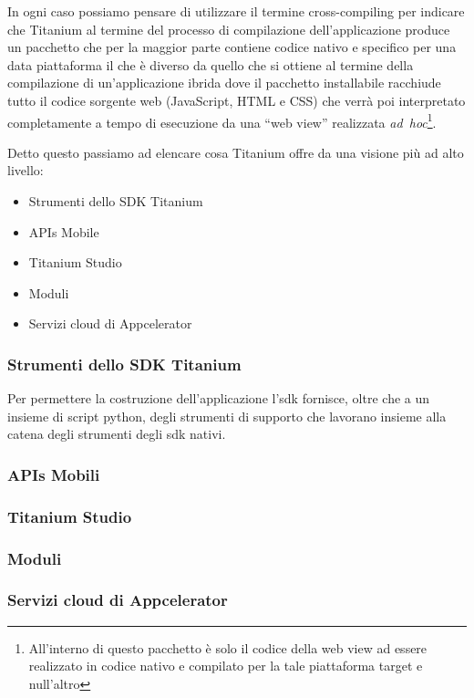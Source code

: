 			In ogni caso possiamo pensare di utilizzare il termine 
			cross-compiling per indicare che Titanium al termine del processo di 
			compilazione dell'applicazione produce un pacchetto che per la 
			maggior parte contiene codice nativo e specifico per una data 
			piattaforma il che è diverso da quello che si ottiene al termine 
			della compilazione di un'applicazione ibrida dove il pacchetto 
			installabile racchiude tutto il codice sorgente web (JavaScript, 
			HTML e CSS) che verrà poi interpretato completamente a tempo di 
			esecuzione da una ``web view'' realizzata 
			\textit{ad~hoc}\footnote{All'interno di questo pacchetto è solo il 
			codice della web view ad essere realizzato in codice nativo e 
			compilato per la tale piattaforma target e null'altro}.
			
			\noindent Detto questo passiamo ad elencare cosa Titanium offre da 
			una visione più ad alto livello:
			\begin{itemize}
				\item Strumenti dello SDK Titanium
				\item APIs Mobile
				\item Titanium Studio
				\item Moduli
				\item Servizi cloud di Appcelerator
			\end{itemize}
	
			\subsubsection{Strumenti dello SDK Titanium}
				Per permettere la costruzione dell'applicazione l'sdk fornisce,
				oltre che a un insieme di script python, degli strumenti di 
				supporto che lavorano insieme alla catena degli strumenti degli
				sdk nativi.
			\subsubsection{APIs Mobili}
			\subsubsection{Titanium Studio}
			\subsubsection{Moduli}
			\subsubsection{Servizi cloud di Appcelerator}
			
